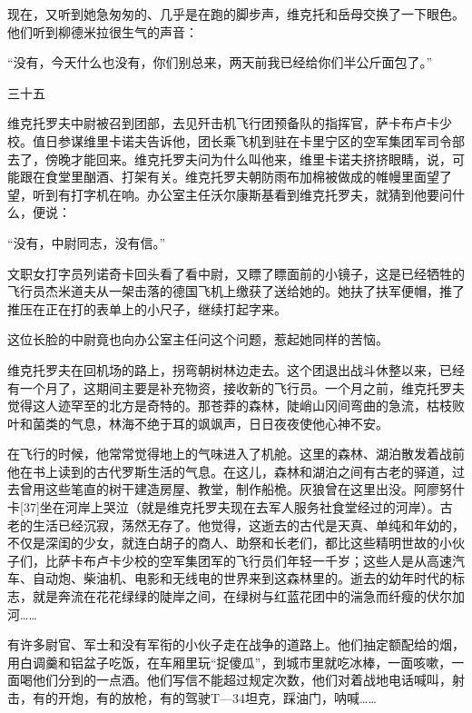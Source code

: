 现在，又听到她急匆匆的、几乎是在跑的脚步声，维克托和岳母交换了一下眼色。他们听到柳德米拉很生气的声音：

“没有，今天什么也没有，你们别总来，两天前我已经给你们半公斤面包了。”

三十五

维克托罗夫中尉被召到团部，去见歼击机飞行团预备队的指挥官，萨卡布卢卡少校。值日参谋维里卡诺夫告诉他，团长乘飞机到驻在卡里宁区的空军集团军司令部去了，傍晚才能回来。维克托罗夫问为什么叫他来，维里卡诺夫挤挤眼睛，说，可能跟在食堂里酗酒、打架有关。维克托罗夫朝防雨布加棉被做成的帷幔里面望了望，听到有打字机在响。办公室主任沃尔康斯基看到维克托罗夫，就猜到他要问什么，便说：

“没有，中尉同志，没有信。”

文职女打字员列诺奇卡回头看了看中尉，又瞟了瞟面前的小镜子，这是已经牺牲的飞行员杰米道夫从一架击落的德国飞机上缴获了送给她的。她扶了扶军便帽，推了推压在正在打的表单上的小尺子，继续打起字来。

这位长脸的中尉竟也向办公室主任问这个问题，惹起她同样的苦恼。

维克托罗夫在回机场的路上，拐弯朝树林边走去。这个团退出战斗休整以来，已经有一个月了，这期间主要是补充物资，接收新的飞行员。一个月之前，维克托罗夫觉得这人迹罕至的北方是奇特的。那苍莽的森林，陡峭山冈间弯曲的急流，枯枝败叶和菌类的气息，林海不绝于耳的飒飒声，日日夜夜使他心神不安。

在飞行的时候，他常常觉得地上的气味进入了机舱。这里的森林、湖泊散发着战前他在书上读到的古代罗斯生活的气息。在这儿，森林和湖泊之间有古老的驿道，过去曾用这些笔直的树干建造房屋、教堂，制作船桅。灰狼曾在这里出没。阿廖努什卡[37]坐在河岸上哭泣（就是维克托罗夫现在去军人服务社食堂经过的河岸）。古老的生活已经沉寂，荡然无存了。他觉得，这逝去的古代是天真、单纯和年幼的，不仅是深闺的少女，就连白胡子的商人、助祭和长老们，都比这些精明世故的小伙子们，比萨卡布卢卡少校的空军集团军的飞行员们年轻一千岁；这些人是从高速汽车、自动炮、柴油机、电影和无线电的世界来到这森林里的。逝去的幼年时代的标志，就是奔流在花花绿绿的陡岸之间，在绿树与红蓝花团中的湍急而纤瘦的伏尔加河……

有许多尉官、军士和没有军衔的小伙子走在战争的道路上。他们抽定额配给的烟，用白调羹和铝盆子吃饭，在车厢里玩“捉傻瓜”，到城市里就吃冰棒，一面咳嗽，一面喝他们分到的一点酒。他们写信不能超过规定次数，他们对着战地电话喊叫，射击，有的开炮，有的放枪，有的驾驶T—34坦克，踩油门，呐喊……

